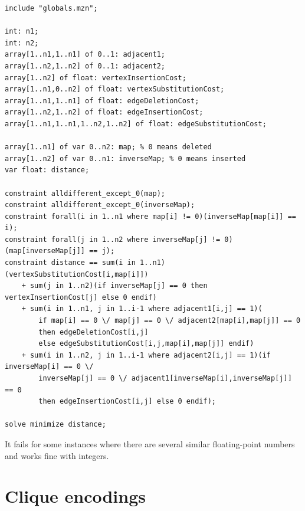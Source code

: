 \documentclass{article}
\theoremstyle{definition}
\begin{document}
\begin{lstlisting}
include "globals.mzn";

int: n1;
int: n2;
array[1..n1,1..n1] of 0..1: adjacent1;
array[1..n2,1..n2] of 0..1: adjacent2;
array[1..n2] of float: vertexInsertionCost;
array[1..n1,0..n2] of float: vertexSubstitutionCost;
array[1..n1,1..n1] of float: edgeDeletionCost;
array[1..n2,1..n2] of float: edgeInsertionCost;
array[1..n1,1..n1,1..n2,1..n2] of float: edgeSubstitutionCost;

array[1..n1] of var 0..n2: map; % 0 means deleted
array[1..n2] of var 0..n1: inverseMap; % 0 means inserted
var float: distance;

constraint alldifferent_except_0(map);
constraint alldifferent_except_0(inverseMap);
constraint forall(i in 1..n1 where map[i] != 0)(inverseMap[map[i]] == i);
constraint forall(j in 1..n2 where inverseMap[j] != 0)(map[inverseMap[j]] == j);
constraint distance == sum(i in 1..n1)(vertexSubstitutionCost[i,map[i]])
    + sum(j in 1..n2)(if inverseMap[j] == 0 then vertexInsertionCost[j] else 0 endif)
    + sum(i in 1..n1, j in 1..i-1 where adjacent1[i,j] == 1)(
        if map[i] == 0 \/ map[j] == 0 \/ adjacent2[map[i],map[j]] == 0
        then edgeDeletionCost[i,j]
        else edgeSubstitutionCost[i,j,map[i],map[j]] endif)
    + sum(i in 1..n2, j in 1..i-1 where adjacent2[i,j] == 1)(if inverseMap[i] == 0 \/
        inverseMap[j] == 0 \/ adjacent1[inverseMap[i],inverseMap[j]] == 0
        then edgeInsertionCost[i,j] else 0 endif);

solve minimize distance;
\end{lstlisting}
It fails for some instances where there are several similar floating-point numbers and works fine with integers.
\section{Clique encodings}
\end{document}
